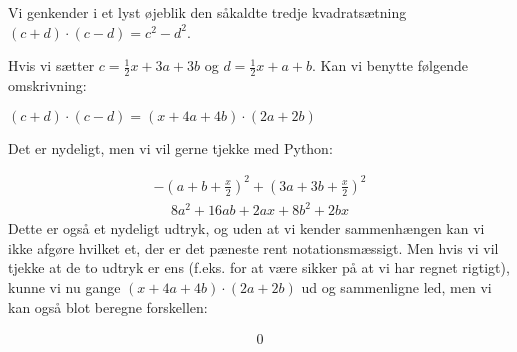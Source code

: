 \documentclass[letterpaper,10pt,english]{jupyterBook}
\begin{document}
Vi genkender i et lyst øjeblik den såkaldte tredje kvadratsætning \((c+d)\cdot(c-d) = c^2-d^2\).

Hvis vi sætter \(c=\frac{1}{2}x+3a+3b\) og \(d=\frac{1}{2}x+a+b\). Kan vi benytte følgende omskrivning:

\((c+d)\cdot(c-d) = (x+4a+4b)\cdot(2a+2b)\)

Det er nydeligt, men vi vil gerne tjekke med Python:

\begin{sphinxVerbatim}[commandchars=\\\{\}]
    
\end{sphinxVerbatim}
\begin{equation*}
\begin{split}\displaystyle - \left(a + b + \frac{x}{2}\right)^{2} + \left(3 a + 3 b + \frac{x}{2}\right)^{2}\end{split}
\end{equation*}\begin{equation*}
\begin{split}\displaystyle 8 a^{2} + 16 a b + 2 a x + 8 b^{2} + 2 b x\end{split}
\end{equation*}
Dette er også et nydeligt udtryk, og uden at vi kender sammenhængen kan vi ikke afgøre hvilket et, der er det pæneste rent notationsmæssigt. Men hvis vi vil tjekke at de to udtryk er ens (f.eks. for at være sikker på at vi har regnet rigtigt), kunne vi nu gange \((x+4a+4b)\cdot(2a+2b)\) ud og sammenligne led, men vi kan også blot beregne forskellen:

\begin{sphinxVerbatim}[commandchars=\\\{\}]
      
\end{sphinxVerbatim}
\begin{equation*}
\begin{split}\displaystyle 0\end{split}
\end{equation*}
\end{document}
